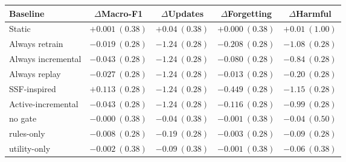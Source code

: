 \begin{tabular}{lcccc}
\toprule
Baseline & $\Delta$Macro-F1 & $\Delta$Updates & $\Delta$Forgetting & $\Delta$Harmful \\
\midrule
Static             & $+0.001\ (0.38)$ & $+0.04\ (0.38)$ & $+0.000\ (0.38)$ & $+0.01\ (1.00)$ \\
Always retrain     & $-0.019\ (0.28)$ & $-1.24\ (0.28)$ & $-0.208\ (0.28)$ & $-1.08\ (0.28)$ \\
Always incremental & $-0.043\ (0.28)$ & $-1.24\ (0.28)$ & $-0.080\ (0.28)$ & $-0.84\ (0.28)$ \\
Always replay      & $-0.027\ (0.28)$ & $-1.24\ (0.28)$ & $-0.013\ (0.28)$ & $-0.20\ (0.28)$ \\
SSF-inspired       & $+0.113\ (0.28)$ & $-1.24\ (0.28)$ & $-0.449\ (0.28)$ & $-1.15\ (0.28)$ \\
Active-incremental & $-0.043\ (0.28)$ & $-1.24\ (0.28)$ & $-0.116\ (0.28)$ & $-0.99\ (0.28)$ \\
\evox{} no gate    & $-0.000\ (0.38)$ & $-0.04\ (0.38)$ & $-0.001\ (0.38)$ & $-0.04\ (0.50)$ \\
\evox{} rules-only & $-0.008\ (0.28)$ & $-0.19\ (0.28)$ & $-0.003\ (0.28)$ & $-0.09\ (0.28)$ \\
\evox{} utility-only & $-0.002\ (0.38)$ & $-0.09\ (0.38)$ & $-0.001\ (0.38)$ & $-0.06\ (0.38)$ \\
\bottomrule
\end{tabular}

